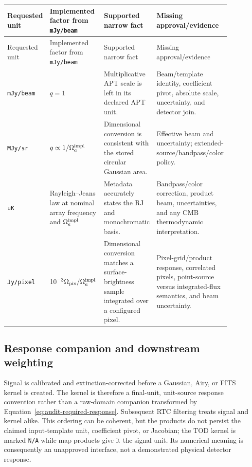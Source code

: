 \documentclass[11pt]{article}
\newcommand{\code}[1]{\nolinkurl{#1}}
\begin{document}
\begin{longtable}{L{0.15\linewidth}L{0.25\linewidth}L{0.23\linewidth}L{0.28\linewidth}}
\toprule
Requested unit & Implemented factor from \code{mJy/beam} & Supported narrow
fact & Missing approval/evidence\\
\midrule
\endfirsthead
\toprule
Requested unit & Implemented factor from \code{mJy/beam} & Supported narrow
fact & Missing approval/evidence\\
\midrule
\endhead
\code{mJy/beam} & \(q=1\) & Multiplicative APT scale is left in its declared
APT unit. & Beam/template identity, coefficient pivot, absolute scale,
uncertainty, and detector join.\\
\code{MJy/sr} & \(q\propto1/\Omega_a^{\rm impl}\) & Dimensional conversion is
consistent with the stored circular Gaussian area. & Effective beam and
uncertainty; extended-source/bandpass/color policy.\\
\code{uK} & Rayleigh--Jeans law at nominal array frequency and
\(\Omega_a^{\rm impl}\) & Metadata accurately states the RJ and monochromatic
basis. & Bandpass/color correction, product beam, uncertainties, and any CMB
thermodynamic interpretation.\\
\code{Jy/pixel} & \(10^{-3}\Omega_{\rm pix}/\Omega_a^{\rm impl}\) &
Dimensional conversion matches a surface-brightness sample integrated over a
configured pixel. & Pixel-grid/product response, correlated pixels,
point-source versus integrated-flux semantics, and beam uncertainty.\\
\bottomrule
\end{longtable}

\subsection{Response companion and downstream weighting}

Signal is calibrated and extinction-corrected before a Gaussian, Airy, or
FITS kernel is created.  The kernel is therefore a final-unit, unit-source
response convention rather than a raw-domain companion transformed by
Equation~\eqref{eq:audit-required-response}.  Subsequent RTC filtering treats
signal and kernel alike.  This ordering can be coherent, but the products do
not persist the claimed input-template unit, coefficient pivot, or Jacobian;
the TOD kernel is marked \code{N/A} while map products give it the signal
unit.  Its numerical meaning is consequently an unapproved interface, not a
demonstrated physical detector response.
\end{document}
